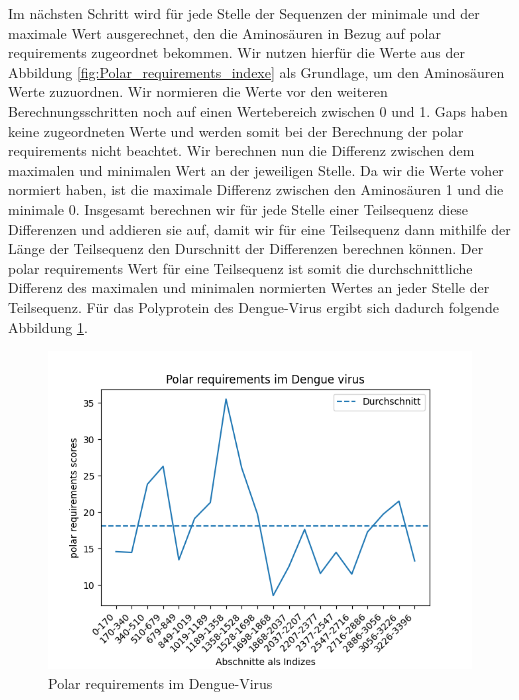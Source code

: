 \documentclass[german,version-2022-01]{uzl-thesis}
\begin{document}
Im n\"achsten Schritt wird f\"ur jede Stelle der Sequenzen der minimale und der maximale Wert ausgerechnet, den die Aminos\"auren in Bezug auf polar requirements zugeordnet bekommen. Wir nutzen hierf\"ur die Werte aus der Abbildung \ref{fig:Polar_requirements_indexe} als Grundlage, um den Aminos\"auren Werte zuzuordnen. Wir normieren die Werte vor den weiteren Berechnungsschritten noch auf einen Wertebereich zwischen 0 und 1. Gaps haben keine zugeordneten Werte und werden somit bei der Berechnung der polar requirements nicht beachtet. Wir berechnen nun die Differenz zwischen dem maximalen und minimalen Wert an der jeweiligen Stelle. Da wir die Werte voher normiert haben, ist die maximale Differenz zwischen den Aminos\"auren 1 und die minimale 0. Insgesamt berechnen wir f\"ur jede Stelle einer Teilsequenz diese Differenzen und addieren sie auf, damit wir f\"ur eine Teilsequenz dann mithilfe der L\"ange der Teilsequenz den Durschnitt der Differenzen berechnen k\"onnen. Der polar requirements Wert f\"ur eine Teilsequenz ist somit die durchschnittliche Differenz des maximalen und minimalen normierten Wertes an jeder Stelle der Teilsequenz. F\"ur das Polyprotein des Dengue-Virus ergibt sich dadurch folgende Abbildung \ref{fig:Dengue_virus_polar_requirements}. 
\begin{figure}[htpb]
  \centering
  \includegraphics[scale=0.75]{Images/Diagramm_Polar_requirements_im_Dengue_virus.png}
  \caption{Polar requirements im Dengue-Virus}
  \label{fig:Dengue_virus_polar_requirements}
\end{figure}
\end{document}
